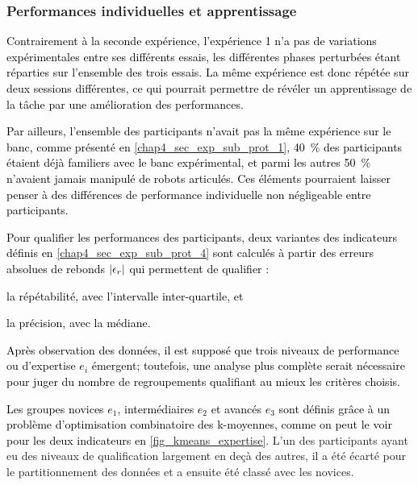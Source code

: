 
\subsubsection{Performances individuelles et apprentissage} \label{chap4_sec_res_sub_task_3}

\textcolor{black}{Contrairement à la seconde expérience, l'expérience 1 n'a pas de variations expérimentales entre ses différents essais, les différentes phases perturbées étant réparties sur l'ensemble des trois essais. La même expérience est donc répétée sur deux sessions différentes, ce qui pourrait permettre de révéler un apprentissage de la tâche par une amélioration des performances.}

\textcolor{black}{Par ailleurs, l'ensemble des participants n'avait pas la même expérience sur le banc, comme présenté en \cref{chap4_sec_exp_sub_prot_1}, \SI{40}{\percent} des participants étaient déjà familiers avec le banc expérimental, et parmi les autres \SI{50}{\percent} n'avaient jamais manipulé de robots articulés. Ces éléments pourraient laisser penser à des différences de performance individuelle non négligeable entre participants.}

\textcolor{black}{Pour qualifier les performances des participants, deux variantes des indicateurs définis en \cref{chap4_sec_exp_sub_prot_4} sont calculés à partir des erreurs absolues de rebonds $\left\lvert\epsilon_r\right\rvert$ qui permettent de qualifier : %
\begin{enumerate*}[label=\arabic*)]
	\item la répétabilité, avec l'intervalle inter-quartile, et
	\item la précision, avec la médiane.
\end{enumerate*}
Après observation des données, il est supposé que trois niveaux de performance ou d'expertise $e_i$ émergent; toutefois, une analyse plus complète serait nécessaire pour juger du nombre de regroupements qualifiant au mieux les critères choisis.}

\textcolor{black}{Les groupes novices $e_1$, intermédiaires $e_2$ et avancés $e_3$ sont définis grâce à un problème d'optimisation combinatoire des k-moyennes, comme on peut le voir pour les deux indicateurs en \cref{fig_kmeans_expertise}.} L'un des participants ayant eu des niveaux de qualification largement en deçà des autres, il a été écarté pour le partitionnement des données %
et a ensuite été classé avec les novices.


